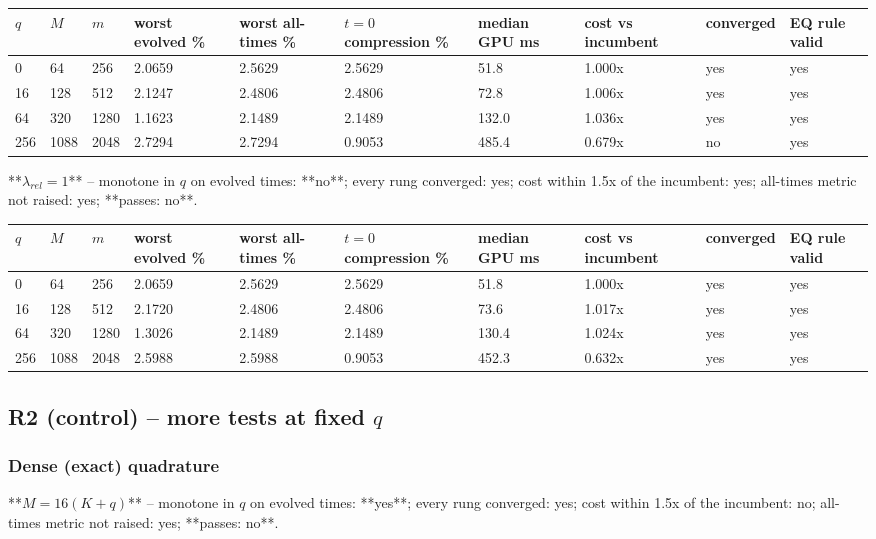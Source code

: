 \documentclass[11pt]{article}
\begin{document}
\begin{table}[htbp]\centering\small
\begin{tabular}{llllllllll}\hline
$q$ & $M$ & $m$ & worst evolved \% & worst all-times \% & $t=0$ compression \% & median GPU ms & cost vs incumbent & converged & EQ rule valid \\ \hline
0 & 64 & 256 & 2.0659 & 2.5629 & 2.5629 & 51.8 & 1.000x & yes & yes \\
16 & 128 & 512 & 2.1247 & 2.4806 & 2.4806 & 72.8 & 1.006x & yes & yes \\
64 & 320 & 1280 & 1.1623 & 2.1489 & 2.1489 & 132.0 & 1.036x & yes & yes \\
256 & 1088 & 2048 & 2.7294 & 2.7294 & 0.9053 & 485.4 & 0.679x & no & yes \\
\hline\end{tabular}
\end{table}
**$\lambda_{rel} = 1$** -- monotone in $q$ on evolved times: **no**; every rung converged: yes; cost within 1.5x of the incumbent: yes; all-times metric not raised: yes; **passes: no**.

\begin{table}[htbp]\centering\small
\begin{tabular}{llllllllll}\hline
$q$ & $M$ & $m$ & worst evolved \% & worst all-times \% & $t=0$ compression \% & median GPU ms & cost vs incumbent & converged & EQ rule valid \\ \hline
0 & 64 & 256 & 2.0659 & 2.5629 & 2.5629 & 51.8 & 1.000x & yes & yes \\
16 & 128 & 512 & 2.1720 & 2.4806 & 2.4806 & 73.6 & 1.017x & yes & yes \\
64 & 320 & 1280 & 1.3026 & 2.1489 & 2.1489 & 130.4 & 1.024x & yes & yes \\
256 & 1088 & 2048 & 2.5988 & 2.5988 & 0.9053 & 452.3 & 0.632x & yes & yes \\
\hline\end{tabular}
\end{table}
\subsection{R2 (control) -- more tests at fixed $q$}
\subsubsection{Dense (exact) quadrature}
**$M = 16(K+q)$** -- monotone in $q$ on evolved times: **yes**; every rung converged: yes; cost within 1.5x of the incumbent: no; all-times metric not raised: yes; **passes: no**.
\end{document}
